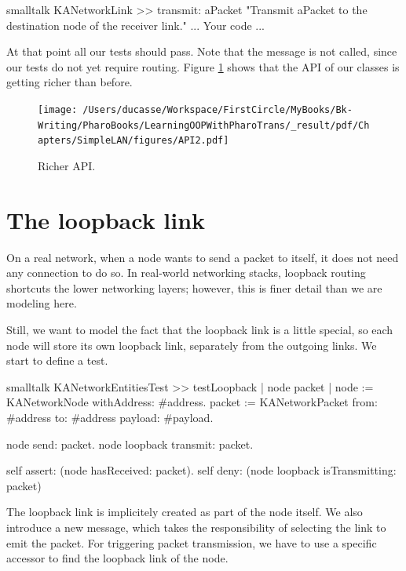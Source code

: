 \documentclass[10pt,twoside,english]{_support/latex/sbabook/sbabook}
\begin{document}
\begin{displaycode}{smalltalk}
KANetworkLink >> transmit: aPacket
    "Transmit aPacket to the destination node of the receiver link."
    ... Your code ...
\end{displaycode}

At that point all our tests should pass.
Note that the message  is not called, since our tests do not yet require routing.
Figure \ref{Api2} shows that the API of our classes is getting richer than before. 


\begin{figure}

\begin{center}
\texttt{[image: /Users/ducasse/Workspace/FirstCircle/MyBooks/Bk-Writing/PharoBooks/LearningOOPWithPharoTrans/\_result/pdf/Chapters/SimpleLAN/figures/API2.pdf]}\caption{Richer API.\label{Api2}}\end{center}
\end{figure}

\section{The loopback link}
On a real network, when a node wants to send a packet to itself, it does not need any connection to do so.
In real-world networking stacks, loopback routing shortcuts the lower networking layers; however, this is finer detail than we are modeling here.

Still, we want to model the fact that the loopback link is a little special, so each node will store its own loopback link, separately from the outgoing links. We start to define a test. 

\begin{displaycode}{smalltalk}
KANetworkEntitiesTest >> testLoopback
    | node packet |
    node := KANetworkNode withAddress: #address.
    packet := KANetworkPacket from: #address to: #address payload: #payload.

    node send: packet.
    node loopback transmit: packet.

    self assert: (node hasReceived: packet).
    self deny: (node loopback isTransmitting: packet)
\end{displaycode}

The loopback link is implicitely created as part of the node itself.
We also introduce a new  message, which takes the responsibility of selecting the link to emit the packet.
For triggering packet transmission, we have to use a specific accessor to find the loopback link of the node.
\end{document}
